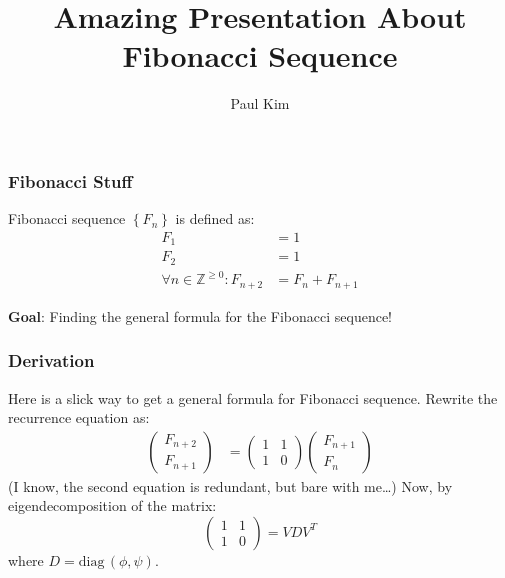\documentclass{beamer}
\title{Amazing Presentation About Fibonacci Sequence}
\author{Paul Kim}
\newcommand{\diag}[1]{\text{diag}\,#1}
\begin{document}
\frame{\titlepage}

\begin{frame}
    \frametitle{Fibonacci Stuff}
    \begin{definition}
        Fibonacci sequence $\left\{ F_n \right\}$ is defined as:
        \begin{align*}
            F_1 &= 1 \\
            F_2 &= 1 \\
            \forall n \in \mathbb{Z}^{\geq 0}: F_{n+2} &= F_{n} + F_{n+1}
        \end{align*}
    \end{definition}
    {
        \textbf{Goal}: Finding the general formula for the Fibonacci sequence!
    }
\end{frame}

\begin{frame}
    \frametitle{Derivation}
    Here is a slick way to get a general formula for Fibonacci sequence.
    {
        Rewrite the recurrence equation as:
        \begin{align*}
            \begin{pmatrix}
                F_{n+2} \\
                F_{n+1}
            \end{pmatrix}
            &= 
            \begin{pmatrix}
                1 & 1 \\
                1 & 0
            \end{pmatrix}
            \begin{pmatrix}
                F_{n+1} \\
                F_n
            \end{pmatrix}
        \end{align*}
        (I know, the second equation is redundant, but bare with me\dots)
    }
    Now, by eigendecomposition of the matrix:
    \begin{equation*}
        \begin{pmatrix}
            1 & 1 \\
            1 & 0
        \end{pmatrix}
        =
        V D V^T
    \end{equation*}
    where $D = \diag{\left( \phi, \psi \right)}$.
\end{frame}
\end{document}
